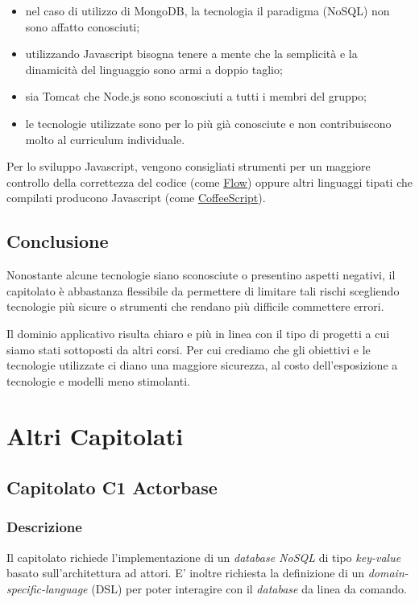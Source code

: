 \documentclass[12pt,a4paper]{article}
\begin{document}
\begin{itemize}
\item nel caso di utilizzo di MongoDB, la tecnologia il paradigma (NoSQL) non sono affatto conosciuti;
\item utilizzando Javascript bisogna tenere a mente che la semplicità e la dinamicità del linguaggio
sono armi a doppio taglio;
\item sia Tomcat che Node.js sono sconosciuti a tutti i membri del gruppo;
\item le tecnologie utilizzate sono per lo più già conosciute e non contribuiscono molto
al curriculum individuale.
\end{itemize}

Per lo sviluppo Javascript, vengono consigliati strumenti per un maggiore controllo della correttezza del
codice (come \href{http://flowtype.org}{Flow}) oppure altri linguaggi tipati che compilati producono Javascript
(come \href{http://coffeescript.org}{CoffeeScript}).

\subsection{Conclusione}

Nonostante alcune tecnologie siano sconosciute o presentino aspetti negativi, il capitolato è abbastanza flessibile
da permettere di limitare tali rischi scegliendo tecnologie più sicure o strumenti che rendano più difficile commettere
errori.

Il dominio applicativo risulta chiaro e più in linea con il tipo di progetti a cui siamo stati sottoposti da altri corsi. 
Per cui crediamo che gli obiettivi e le tecnologie utilizzate
ci diano una maggiore sicurezza, al costo dell'esposizione a tecnologie e modelli meno stimolanti.

\newpage
\section{Altri Capitolati}

\subsection{Capitolato C1 Actorbase}
\subsubsection{Descrizione}

Il capitolato richiede l'implementazione di un \textit{database NoSQL} di tipo \textit{key-value} basato
sull'architettura ad attori. E' inoltre richiesta la definizione di un \textit{domain-specific-language} (DSL)
per poter interagire con il \textit{database} da linea da comando.
\end{document}
